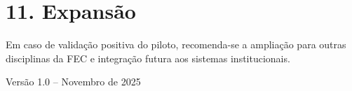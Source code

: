 \documentclass[12pt,a4paper]{article}
\begin{document}

\section*{11. Expansão}

Em caso de validação positiva do piloto, recomenda-se a ampliação para outras disciplinas da FEC e integração futura aos sistemas institucionais.


\vfill
\begin{center}
    Versão 1.0 -- Novembro de 2025
\end{center}
\end{document}
